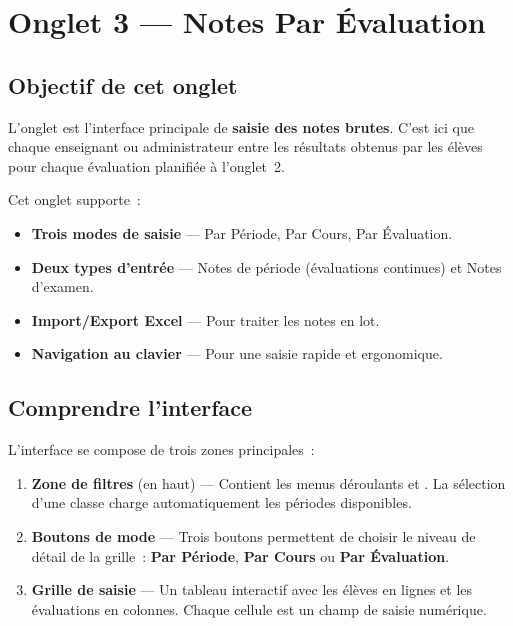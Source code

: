 \chapter{Onglet 3 --- Notes Par \'Evaluation}

\section{Objectif de cet onglet}

L'onglet  est l'interface principale de \textbf{saisie des notes brutes}. C'est ici que chaque enseignant ou administrateur entre les r\'esultats obtenus par les \'el\`eves pour chaque \'evaluation planifi\'ee \`a l'onglet~2.

Cet onglet supporte~:
\begin{itemize}
  \item \textbf{Trois modes de saisie} --- Par P\'eriode, Par Cours, Par \'Evaluation.
  \item \textbf{Deux types d'entr\'ee} --- Notes de p\'eriode (\'evaluations continues) et Notes d'examen.
  \item \textbf{Import/Export Excel} --- Pour traiter les notes en lot.
  \item \textbf{Navigation au clavier} --- Pour une saisie rapide et ergonomique.
\end{itemize}

\section{Comprendre l'interface}

L'interface se compose de trois zones principales~:

\begin{enumerate}[leftmargin=1.2cm]
  \item \textbf{Zone de filtres} (en haut) --- Contient les menus d\'eroulants  et . La s\'election d'une classe charge automatiquement les p\'eriodes disponibles.
  \item \textbf{Boutons de mode} --- Trois boutons permettent de choisir le niveau de d\'etail de la grille~: \textbf{Par P\'eriode}, \textbf{Par Cours} ou \textbf{Par \'Evaluation}.
  \item \textbf{Grille de saisie} --- Un tableau interactif avec les \'el\`eves en lignes et les \'evaluations en colonnes. Chaque cellule est un champ de saisie num\'erique.
\end{enumerate}

